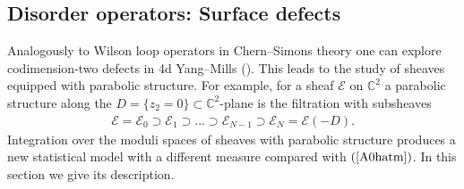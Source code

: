 \documentclass[12pt]{article}
\numberwithin{equation}{section}
\theoremstyle{definition}
\begin{document}
\subsection{Disorder operators: Surface defects}
Analogously to Wilson loop operators in Chern--Simons theory one can explore codimension-two defects in 4d Yang--Mills (\cite{Nekrasov:2021tik}). This leads to the study of sheaves equipped with parabolic structure. For example, for a sheaf $\mathcal{E}$ on $\mathbb{C}^{2}$ a parabolic structure along the $D = \{z_{2} = 0\} \subset \mathbb{C}^{2}$-plane is the filtration with subsheaves
\begin{align}
    \mathcal{E} = \mathcal{E}_0 \supset \mathcal{E}_{1} \supset ... \supset \mathcal{E}_{N-1} \supset \mathcal{E}_{N} = \mathcal{E}(-D).
\end{align}
Integration over the moduli spaces of sheaves with parabolic structure produces a new statistical model with a different measure compared with $(\ref{A0hatm})$. In this section we give its description. 
\end{document}
